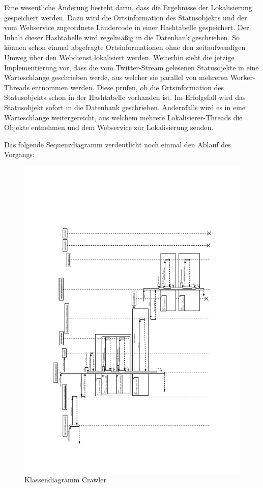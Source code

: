 Eine wesentliche Änderung besteht darin, dass die Ergebnisse der Lokalisierung gespeichert werden. Dazu wird die Ortsinformation des Statusobjekts und der vom Webservice zugeordnete Ländercode in einer Hashtabelle gespeichert. Der Inhalt dieser Hashtabelle wird regelmäßig in die Datenbank geschrieben. So können schon einmal abgefragte Ortsinformationen ohne den zeitaufwendigen Umweg über den Webdienst lokalisiert werden. 
Weiterhin sieht die jetzige Implementierung vor, dass die vom Twitter-Stream gelesenen Statusojekte in eine Warteschlange geschrieben werde, aus welcher sie parallel von mehreren Worker-Threads entnommen werden. Diese prüfen, ob die Ortsinformation des Statusobjekts schon in der Hashtabelle vorhanden ist. Im Erfolgsfall wird das Statusobjekt sofort in die Datenbank geschrieben. Andernfalls wird es in eine  Warteschlange weitergereicht, aus welchem mehrere Lokalisierer-Threads die Objekte entnehmen und dem Webservice zur Lokalisierung senden.

Das folgende Sequenzdiagramm verdeutlicht noch einmal den Ablauf des Vorgangs:
\begin{figure}[H]
	\centering
	\includegraphics[width=\textwidth,height=\textheight,keepaspectratio=true]{dia/crawler_process_sequence}
	\caption{Klassendiagramm Crawler}
	\label{fig:Crawler}
\end{figure}

